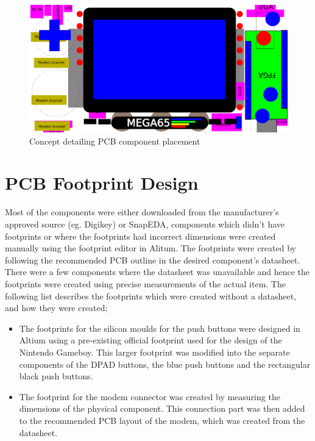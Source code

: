 \begin{figure}
	\includegraphics[width=\linewidth]{Figures/handset-layout-v1-no-PCB-no-cover.pdf}
	\caption{Concept detailing PCB component placement }
	\label{fig:nopcb}
\end{figure}

\section{PCB Footprint Design}

	Most of the components were either downloaded from the manufacturer's approved source (eg. Digikey) or SnapEDA, components which didn't have footprints or where the footprints had incorrect dimensions were created manually using the footprint editor in Alitum. The footprints were created by following the recommended PCB outline in the desired component's datasheet. There were a few components where the datasheet was unavailable and hence the footprints were created using precise measurements of the actual item. The following list describes the footprints which were created without a datasheet, and how they were created;

\begin{itemize}
\item The footprints for the silicon moulds for the push buttons were designed in Altium using a pre-existing official footprint used for the design of the Nintendo Gameboy. This larger footprint was modified into the separate components of the DPAD buttons, the blue push buttons and the rectangular black push buttons.
\item The footprint for the modem connector was created by measuring the dimensions of the physical component. This connection part was then added to the recommended PCB layout of the modem, which was created from the datasheet. 
\end{itemize}

